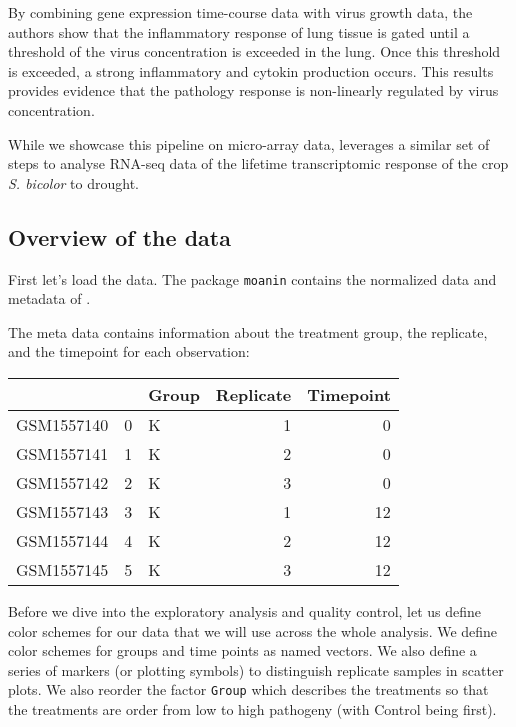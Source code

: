 \documentclass[9pt,a4paper,]{extarticle}
\newenvironment{Shaded}{\begin{snugshade}}{\end{snugshade}}
\newcommand{\CommentTok}[1]{\textcolor[rgb]{0.56,0.35,0.01}{\textit{#1}}}
\newcommand{\KeywordTok}[1]{\textcolor[rgb]{0.13,0.29,0.53}{\textbf{#1}}}
\newcommand{\NormalTok}[1]{#1}
\newcommand{\OperatorTok}[1]{\textcolor[rgb]{0.81,0.36,0.00}{\textbf{#1}}}
\newcommand{\StringTok}[1]{\textcolor[rgb]{0.31,0.60,0.02}{#1}}
\begin{document}
By combining gene expression time-course data with virus growth data, the
authors show that the inflammatory response of lung tissue is gated until a
threshold of the virus concentration is exceeded in the lung. Once this
threshold is exceeded, a strong inflammatory and cytokin production occurs.
This results provides evidence that the pathology response is non-linearly
regulated by virus concentration.

While we showcase this pipeline on micro-array data,
\citep{varoquaux:transcriptomic}
leverages a similar set of steps to analyse RNA-seq data of the lifetime
transcriptomic response of the crop \emph{S. bicolor} to drought.

\hypertarget{overview-of-the-data}{%
\subsection{Overview of the data}\label{overview-of-the-data}}

First let's load the data. The package \texttt{moanin} contains the normalized
data and metadata of \citep{shoemaker:ultrasensitive}.

\begin{Shaded}
\end{Shaded}

The meta data contains information about the treatment group, the replicate,
and the timepoint for each observation:

\begin{tabular}{l|r|l|r|r}
\hline
  &  & Group & Replicate & Timepoint\\
\hline
GSM1557140 & 0 & K & 1 & 0\\
\hline
GSM1557141 & 1 & K & 2 & 0\\
\hline
GSM1557142 & 2 & K & 3 & 0\\
\hline
GSM1557143 & 3 & K & 1 & 12\\
\hline
GSM1557144 & 4 & K & 2 & 12\\
\hline
GSM1557145 & 5 & K & 3 & 12\\
\hline
\end{tabular}

Before we dive into the exploratory analysis and quality control, let us
define color schemes for our data that we will use across the whole analysis.
We define color schemes for groups and time points as named vectors. We also
define a series of markers (or plotting symbols) to distinguish replicate
samples in scatter plots. We also reorder the factor \texttt{Group} which describes the treatments so that the treatments are order from low to high pathogeny (with Control being first).
\end{document}
